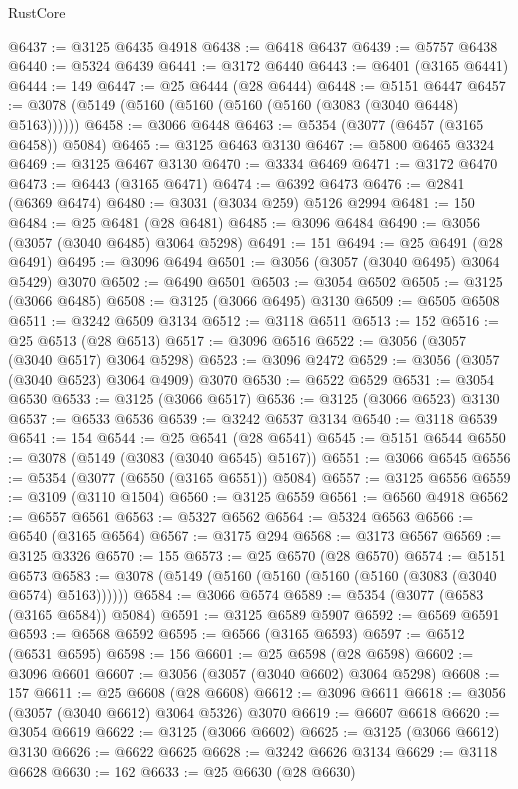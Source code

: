 \begin{lexlean}{RustCore}
\begin{coremodule}
@6437 := @3125 @6435 @4918
@6438 := @6418 @6437
@6439 := @5757 @6438
@6440 := @5324 @6439
@6441 := @3172 @6440
@6443 := @6401 (@3165 @6441)
@6444 := 149
@6447 := @25 @6444 (@28 @6444)
@6448 := @5151 @6447
@6457 := @3078 (@5149 (@5160 (@5160 (@5160 (@5160 (@3083 (@3040 @6448) @5163))))))
@6458 := @3066 @6448
@6463 := @5354 (@3077 (@6457 (@3165 @6458)) @5084)
@6465 := @3125 @6463 @3130
@6467 := @5800 @6465 @3324
@6469 := @3125 @6467 @3130
@6470 := @3334 @6469
@6471 := @3172 @6470
@6473 := @6443 (@3165 @6471)
@6474 := @6392 @6473
@6476 := @2841 (@6369 @6474)
@6480 := @3031 (@3034 @259) @5126 @2994
@6481 := 150
@6484 := @25 @6481 (@28 @6481)
@6485 := @3096 @6484
@6490 := @3056 (@3057 (@3040 @6485) @3064 @5298)
@6491 := 151
@6494 := @25 @6491 (@28 @6491)
@6495 := @3096 @6494
@6501 := @3056 (@3057 (@3040 @6495) @3064 @5429) @3070
@6502 := @6490 @6501
@6503 := @3054 @6502
@6505 := @3125 (@3066 @6485)
@6508 := @3125 (@3066 @6495) @3130
@6509 := @6505 @6508
@6511 := @3242 @6509 @3134
@6512 := @3118 @6511
@6513 := 152
@6516 := @25 @6513 (@28 @6513)
@6517 := @3096 @6516
@6522 := @3056 (@3057 (@3040 @6517) @3064 @5298)
@6523 := @3096 @2472
@6529 := @3056 (@3057 (@3040 @6523) @3064 @4909) @3070
@6530 := @6522 @6529
@6531 := @3054 @6530
@6533 := @3125 (@3066 @6517)
@6536 := @3125 (@3066 @6523) @3130
@6537 := @6533 @6536
@6539 := @3242 @6537 @3134
@6540 := @3118 @6539
@6541 := 154
@6544 := @25 @6541 (@28 @6541)
@6545 := @5151 @6544
@6550 := @3078 (@5149 (@3083 (@3040 @6545) @5167))
@6551 := @3066 @6545
@6556 := @5354 (@3077 (@6550 (@3165 @6551)) @5084)
@6557 := @3125 @6556
@6559 := @3109 (@3110 @1504)
@6560 := @3125 @6559
@6561 := @6560 @4918
@6562 := @6557 @6561
@6563 := @5327 @6562
@6564 := @5324 @6563
@6566 := @6540 (@3165 @6564)
@6567 := @3175 @294
@6568 := @3173 @6567
@6569 := @3125 @3326
@6570 := 155
@6573 := @25 @6570 (@28 @6570)
@6574 := @5151 @6573
@6583 := @3078 (@5149 (@5160 (@5160 (@5160 (@5160 (@3083 (@3040 @6574) @5163))))))
@6584 := @3066 @6574
@6589 := @5354 (@3077 (@6583 (@3165 @6584)) @5084)
@6591 := @3125 @6589 @5907
@6592 := @6569 @6591
@6593 := @6568 @6592
@6595 := @6566 (@3165 @6593)
@6597 := @6512 (@6531 @6595)
@6598 := 156
@6601 := @25 @6598 (@28 @6598)
@6602 := @3096 @6601
@6607 := @3056 (@3057 (@3040 @6602) @3064 @5298)
@6608 := 157
@6611 := @25 @6608 (@28 @6608)
@6612 := @3096 @6611
@6618 := @3056 (@3057 (@3040 @6612) @3064 @5326) @3070
@6619 := @6607 @6618
@6620 := @3054 @6619
@6622 := @3125 (@3066 @6602)
@6625 := @3125 (@3066 @6612) @3130
@6626 := @6622 @6625
@6628 := @3242 @6626 @3134
@6629 := @3118 @6628
@6630 := 162
@6633 := @25 @6630 (@28 @6630)

\end{coremodule}
\end{lexlean}
